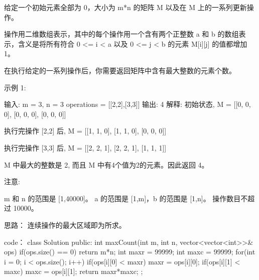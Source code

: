 给定一个初始元素全部为 0，大小为 m*n 的矩阵 M 以及在 M 上的一系列更新操作。

操作用二维数组表示，其中的每个操作用一个含有两个正整数 a 和 b 的数组表示，含义是将所有符合 0 <= i < a 以及 0 <= j < b 的元素 M[i][j] 的值都增加 1。

在执行给定的一系列操作后，你需要返回矩阵中含有最大整数的元素个数。

示例 1:

输入: 
m = 3, n = 3
operations = [[2,2],[3,3]]
输出: 4
解释: 
初始状态, M = 
[[0, 0, 0],
 [0, 0, 0],
 [0, 0, 0]]

执行完操作 [2,2] 后, M = 
[[1, 1, 0],
 [1, 1, 0],
 [0, 0, 0]]

执行完操作 [3,3] 后, M = 
[[2, 2, 1],
 [2, 2, 1],
 [1, 1, 1]]

M 中最大的整数是 2, 而且 M 中有4个值为2的元素。因此返回 4。

注意:

    m 和 n 的范围是 [1,40000]。
    a 的范围是 [1,m]，b 的范围是 [1,n]。
    操作数目不超过 10000。




















思路：
连续操作的最大区域即为所求。





















code：
class Solution {
public:
    int maxCount(int m, int n, vector<vector<int>>& ops) {
        if(ops.size() == 0) return m*n;
        int maxr = 99999;
        int maxc = 99999;
        for(int i = 0; i < ops.size(); i++)
        {
            if(ops[i][0] < maxr) maxr = ops[i][0];
            if(ops[i][1] < maxc) maxc = ops[i][1];
        }
        return maxr*maxc;
    }
};